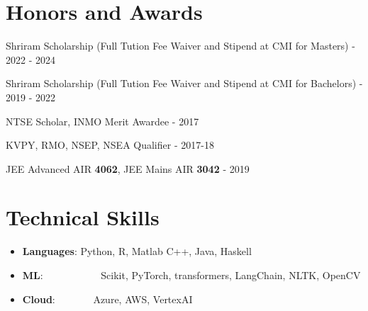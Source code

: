 \documentclass[a4paper,20pt]{article}
\newcommand{\resumeItem}[2]{
  \item\small{
    \textbf{#1}{: #2 \vspace{-2pt}}
  }
}
\newcommand{\resumeSubItem}[2]{\resumeItem{#1}{#2}\vspace{-3pt}}
\newcommand{\resumeSubHeadingListStart}{\begin{itemize}[leftmargin=*]}
\newcommand{\resumeSubHeadingListEnd}{\end{itemize}}
\begin{document}
\vspace{-5pt}
\section{Honors and Awards}
\begin{description}[font=$\bullet$]
\item {Shriram Scholarship (Full Tution Fee Waiver and Stipend at CMI for Masters) - 2022 - 2024}
\vspace{-5pt}
\item {Shriram Scholarship (Full Tution Fee Waiver and Stipend at CMI for Bachelors) - 2019 - 2022}
\vspace{-5pt}
\item {NTSE Scholar, INMO Merit Awardee - 2017}
\vspace{-5pt}
\item {KVPY, RMO, NSEP, NSEA Qualifier - 2017-18}
\vspace{-5pt}
\item {JEE Advanced AIR \textbf{4062}, JEE Mains AIR \textbf{3042}  - 2019}

\end{description}
\vspace{-5pt}

\vspace{-5pt}
\section{Technical Skills}
	\resumeSubHeadingListStart
	\resumeSubItem{Languages}{Python, R, Matlab C++, Java, Haskell}
	\resumeSubItem{ML}{~~~~~~~~~~~Scikit, PyTorch, transformers, LangChain, NLTK, OpenCV}
  \resumeSubItem{Cloud}{~~~~~~~Azure, AWS, VertexAI}

\resumeSubHeadingListEnd
\vspace{-5pt}






\begin{comment}
\vspace{-5pt}
\section{Publications}
\resumeSubHeadingListStart
\resumeSubItem{Book: Deep Learning on Web (Web Development, Deep Learning)}{Work in Progress book to be published by Packt Publishing in late 2019. Tech: Django, Python, AWS, GCP, Azure (November '18)}
\vspace{2pt}
\resumeSubItem{Book: Deep Learning on Mobile Devices (Flutter App Development, Deep Learning)}{Work in Progress book to be published by Packt Publishing in late 2019. Tech: Flutter, Android, Firebase, TensorFlow, Python, Dart (December '18)}
\resumeSubHeadingListEnd
\end{comment}
\end{document}
